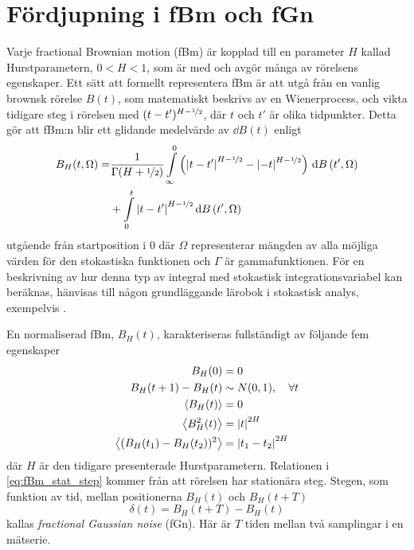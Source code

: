 \chapter{Fördjupning i fBm och fGn}
\label{sec:App_fBm}

Varje fractional Brownian motion (fBm) är kopplad till en parameter $H$ kallad Hurstparametern, $0<H<1$, som är med och avgör många av rörelsens egenskaper. Ett sätt att formellt representera fBm är att utgå från en vanlig brownsk rörelse $B(t)$, som matematiskt beskrivs av en Wienerprocess, och vikta tidigare steg i rörelsen med $(t-t')^{H-\nicefrac{1}{2}}$, där $t$ och $t'$ är olika tidpunkter. Detta gör att fBm:n blir ett glidande medelvärde av $\dd{B}(t)$ enligt \cite{Mandelbrot_fBm1968}
\begin{equation} \label{eq:fBm_repr}
\begin{aligned}
    B_H(t,\Omega)=& \frac{1}{\Gamma(H+\nicefrac{1}{2})}
    \int_{\infty}^0 \left( \abs{t-t'}^{H-\nicefrac{1}{2}}-\abs{-t}^{H-\nicefrac{1}{2}}\right)\,\dd{B}(t',\Omega) \\
    &+ \int_0^t \abs{t-t'}^{H-\nicefrac{1}{2}} \dd{B}(t',\Omega)
\end{aligned}
\end{equation}
utgående från startposition i 0 där $\Omega$ representerar mängden av alla möjliga värden för den stokastiska funktionen och $\Gamma$ är gammafunktionen. För en beskrivning av hur denna typ av integral med stokastisk integrationsvariabel kan beräknas, hänvisas till någon grundläggande lärobok i stokastisk analys, exempelvis \cite{Oksendal2002}.

En normaliserad fBm, $B_H(t)$, karakteriseras fullständigt av följande fem egenskaper~\cite{Dieker_fBm}
\begin{subequations}
\begin{align} 
    B_H(0)&=0 \\ 
    B_H(t+1)-B_H(t) &\sim N(0,1)\qcomma \forall t \label{eq:fBm_normstep}\\
    \ev{B_H(t)}&=0 \label{eq:fBm_mean} \\
    \ev{B^2_H(t)}&=\abs{t}^{2H} \label{eq:fBm_var}\\
    \ev{(B_H(t_1)-B_H(t_2))^2}&=\abs{t_1-t_2}^{2H}  \label{eq:fBm_stat_step}
\end{align}
\end{subequations}
där $H$ är den tidigare presenterade Hurstparametern. Relationen i \eqref{eq:fBm_stat_step} kommer från att rörelsen har stationära steg. Stegen, som funktion av tid, mellan positionerna $B_H(t)$ och $B_H(t+T)$
\begin{equation} \label{eq:fracGauss}
    \delta(t) = B_H(t+T) - B_H(t)
\end{equation}
kallas \emph{fractional Gaussian noise} (fGn). Här är $T$ tiden mellan två samplingar i en mätserie. 

